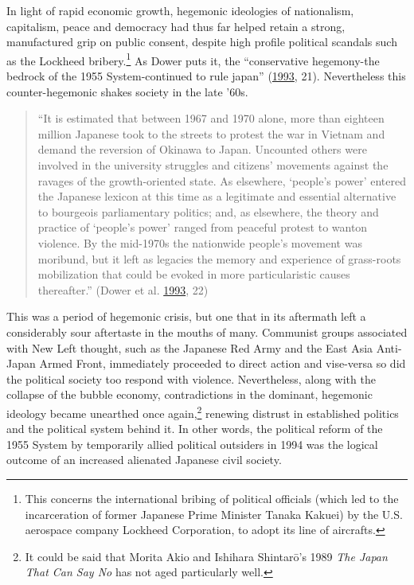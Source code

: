 \documentclass[10pt,british,A4paper,oneside]{memoir}
\begin{document}
In light of rapid economic growth, hegemonic ideologies of nationalism,
capitalism, peace and democracy had thus far helped retain a strong,
manufactured grip on public consent, despite high profile political
scandals such as the Lockheed bribery.\footnote{This concerns the
  international bribing of political officials (which led to the
  incarceration of former Japanese Prime Minister Tanaka Kakuei) by the
  U.S. aerospace company Lockheed Corporation, to adopt its line of
  aircrafts.} As Dower puts it, the ``conservative hegemony-the bedrock
of the 1955 System-continued to rule japan''
(\protect\hyperlink{ref-dower_peace_1993}{1993}, 21). Nevertheless this
counter-hegemonic shakes society in the late '60s.

\begin{quote}
``It is estimated that between 1967 and 1970 alone, more than eighteen
million Japanese took to the streets to protest the war in Vietnam and
demand the reversion of Okinawa to Japan. Uncounted others were involved
in the university struggles and citizens' movements against the ravages
of the growth-oriented state. As elsewhere, `people's power' entered the
Japanese lexicon at this time as a legitimate and essential alternative
to bourgeois parliamentary politics; and, as elsewhere, the theory and
practice of `people's power' ranged from peaceful protest to wanton
violence. By the mid-1970s the nationwide people's movement was
moribund, but it left as legacies the memory and experience of
grass-roots mobilization that could be evoked in more particularistic
causes thereafter.'' (Dower et al.
\protect\hyperlink{ref-dower_peace_1993}{1993}, 22)
\end{quote}

This was a period of hegemonic crisis, but one that in its aftermath
left a considerably sour aftertaste in the mouths of many. Communist
groups associated with New Left thought, such as the Japanese Red Army
and the East Asia Anti-Japan Armed Front, immediately proceeded to
direct action and vise-versa so did the political society too respond
with violence. Nevertheless, along with the collapse of the bubble
economy, contradictions in the dominant, hegemonic ideology became
unearthed once again,\footnote{It could be said that Morita Akio and
  Ishihara Shintarō's 1989 \emph{The Japan That Can Say No} has not aged
  particularly well.} renewing distrust in established politics and the
political system behind it. In other words, the political reform of the
1955 System by temporarily allied political outsiders in 1994 was the
logical outcome of an increased alienated Japanese civil society.
\end{document}
